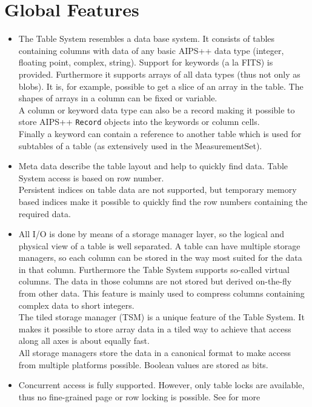 \section{Global Features}
\begin{itemize}
\item
The Table System resembles a data base system. It consists of tables
containing columns with data of any basic AIPS++ data type
(integer, floating point, complex, string). Support for keywords
(a la FITS) is provided. Furthermore it supports arrays of all data
types (thus not only as blobs). It is, for example, possible
to get a slice of an array in the table.
The shapes of arrays in a column can be fixed or variable.
\\A column or keyword data type can also be a record making it possible
to store AIPS++ \texttt{Record} objects into the keywords or column
cells.
\\Finally a keyword can contain a reference to another table which is
used for subtables of a table (as extensively used in the
MeasurementSet). 
\item
Meta data describe the table layout and help to quickly find data.
Table System access is based on row number.
\\Persistent indices on table data are not supported, but
temporary memory based indices make it possible to quickly find
the row numbers containing the required data.
\item
All I/O is done by means of a storage manager layer, so
the logical and physical view of a table is well separated.
A table can have multiple storage managers, so each column
can be stored in the way most suited for the data in that column.
Furthermore the Table System supports so-called virtual columns. The
data in those columns are not stored but derived on-the-fly from
other data. This feature is mainly used to compress columns
containing complex data to short integers.
\\The tiled storage manager (TSM) is a unique feature of the Table System.
It makes it possible to store array data in a tiled way to achieve that
access along all axes is about equally fast.
\\All storage managers store the data in a canonical format to make access from
multiple platforms possible. Boolean values are stored as bits.
\item
Concurrent access is fully supported. However, only table locks are
available, thus no fine-grained page or row locking is possible.
See  for more

\end{itemize}
